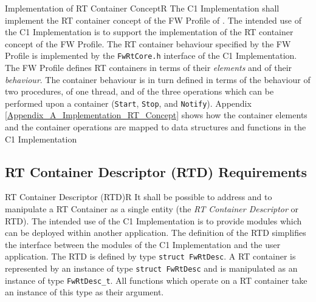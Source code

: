 \documentclass[a4paper,10pt]{article}
\newenvironment{fw_req}[6]
{\addtocounter{subsubsection}{1}
	\hspace{0.2cm}\textbf{FW-\arabic{section}.\arabic{subsection}.\arabic{subsubsection}/#2
	\hspace{0.8cm} #1}
	\vspace{-10pt}
\begin{longtable}{p{2.7cm}P{8.5cm}}
\hline
\textsc{Requirement} & #3 \\
\textsc{Justification} & #4 \\
\textsc{Implementation} & #5  \\ 
\textsc{Verification} & #6  \\
\hline
}
{\end{longtable}}
\begin{document}

\begin{fw_req}{Implementation of RT Container Concept}{R}
{The C1 Implementation shall implement the RT container concept of the FW Profile of \cite{ref:fwprofile}.}
{The intended use of the C1 Implementation is to support the implementation of the RT container concept of the FW Profile.}
{The RT container behaviour specified by the FW Profile is implemented by the \texttt{FwRtCore.h} interface of the C1 Implementation.} 
{The FW Profile defines RT containers in terms of their \emph{elements} 
and of their \emph{behaviour}. The container behaviour is in turn defined in terms of the behaviour of two procedures, of one thread, and of the three operations which can be performed upon a container (\texttt{Start}, \texttt{Stop}, and \texttt{Notify}). Appendix \ref{Appendix_A_Implementation_RT_Concept} shows how the container elements and the container operations are mapped to data structures and functions in the C1 Implementation}
\end{fw_req}


\subsection{RT Container Descriptor (RTD) Requirements}\label{req:RTD}

\begin{fw_req}{RT Container Descriptor (RTD)}{R}
{It shall be possible to address and to manipulate a RT Container as a single entity (the \emph{RT Container Descriptor} or RTD).}
{The intended use of the C1 Implementation is to provide modules which can be deployed within another application. The definition of the RTD simplifies the interface between the modules of the C1 Implementation and the user application.}
{The RTD is defined by type \texttt{struct FwRtDesc}.} 
{A RT container is represented by an instance of type \texttt{struct FwRtDesc} and is manipulated as an instance of type \texttt{FwRtDesc\_t}. All functions which operate on a RT container take an instance of this type as their argument.}
\end{fw_req}
\end{document}
